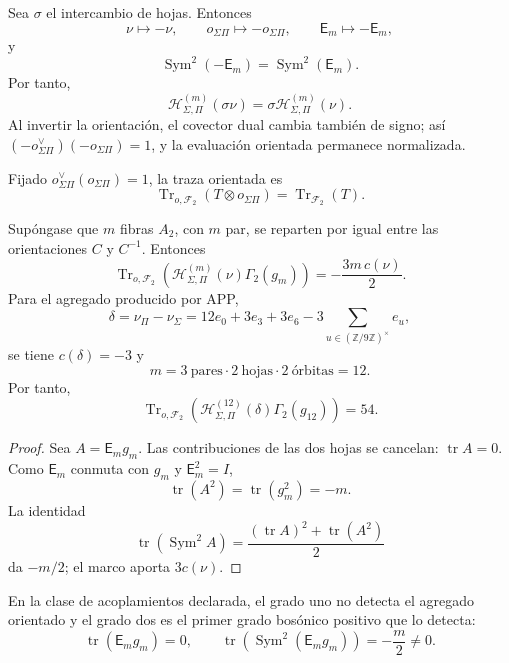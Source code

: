 Sea \(\sigma\) el intercambio de hojas. Entonces
\[
\nu\longmapsto-\nu,\qquad
o_{\Sigma\Pi}\longmapsto-o_{\Sigma\Pi},\qquad
\mathsf E_m\longmapsto-\mathsf E_m,
\]
y
\[
\operatorname{Sym}^2(-\mathsf E_m)
=\operatorname{Sym}^2(\mathsf E_m).
\]
Por tanto,
\[
\mathcal H_{\Sigma,\Pi}^{(m)}(\sigma\nu)
=\sigma\mathcal H_{\Sigma,\Pi}^{(m)}(\nu).
\]
Al invertir la orientación, el covector dual cambia también de signo; así
\((-o_{\Sigma\Pi}^{\vee})(-o_{\Sigma\Pi})=1\), y la evaluación orientada
permanece normalizada.

Fijado
\(o_{\Sigma\Pi}^{\vee}(o_{\Sigma\Pi})=1\), la traza orientada es
\[
\operatorname{Tr}_{o,\mathcal F_2}
(T\otimes o_{\Sigma\Pi})
=\operatorname{Tr}_{\mathcal F_2}(T).
\]

\begin{theorem}
\label{p12-83-c20-s7:thm:indice-orientado-app-fock}
Supóngase que \(m\) fibras \(A_2\), con \(m\) par, se reparten por igual
entre las orientaciones \(C\) y \(C^{-1}\). Entonces
\[
\boxed{
\operatorname{Tr}_{o,\mathcal F_2}
\left(
\mathcal H_{\Sigma,\Pi}^{(m)}(\nu)\Gamma_2(g_m)
\right)
=-\frac{3m\,c(\nu)}2.}
\]
Para el agregado producido por APP,
\[
\delta=\nu_\Pi-\nu_\Sigma
=12e_0+3e_3+3e_6
-3\sum_{u\in(\mathbb Z/9\mathbb Z)^\times}e_u,
\]
se tiene \(c(\delta)=-3\) y
\[
m=3\ \text{pares}\cdot2\ \text{hojas}\cdot2\ \text{órbitas}=12.
\]
Por tanto,
\[
\boxed{
\operatorname{Tr}_{o,\mathcal F_2}
\left(
\mathcal H_{\Sigma,\Pi}^{(12)}(\delta)\Gamma_2(g_{12})
\right)=54.}
\]
\end{theorem}

\begin{proof}
Sea \(A=\mathsf E_mg_m\). Las contribuciones de las dos hojas se cancelan:
\(\operatorname{tr}A=0\). Como \(\mathsf E_m\) conmuta con \(g_m\) y
\(\mathsf E_m^2=I\),
\[
\operatorname{tr}(A^2)=\operatorname{tr}(g_m^2)=-m.
\]
La identidad
\[
\operatorname{tr}(\operatorname{Sym}^2A)
=\frac{(\operatorname{tr}A)^2+\operatorname{tr}(A^2)}2
\]
da \(-m/2\); el marco aporta \(3c(\nu)\).
\end{proof}

\begin{corollary}
\label{p12-83-c20-s7:cor:minimalidad-grado-dos-app-fock-u030}
En la clase de acoplamientos declarada, el grado uno no detecta el agregado
orientado y el grado dos es el primer grado bosónico positivo que lo
detecta:
\[
 \operatorname{tr}(\mathsf E_mg_m)=0,
 \qquad
 \operatorname{tr}\!\left(
 \operatorname{Sym}^2(\mathsf E_mg_m)
 \right)=-\frac m2\neq0.
\]
\end{corollary}

